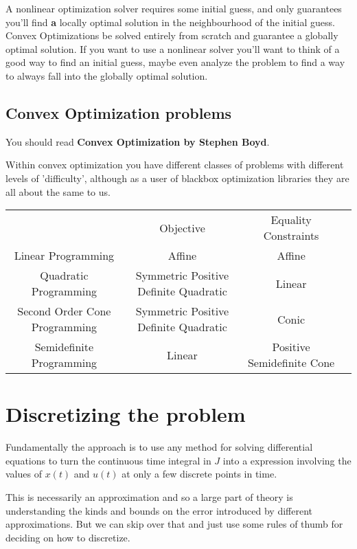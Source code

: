 \documentclass[a4paper, 10pt, twocolumn]{article}
\begin{document}
A nonlinear optimization solver requires some initial guess, and only guarantees you'll find \textbf{a} locally optimal solution in the neighbourhood of the initial guess. Convex Optimizations be solved entirely from scratch and guarantee a globally optimal solution. If you want to use a nonlinear solver you'll want to think of a good way to find an initial guess, maybe even analyze the problem to find a way to always fall into the globally optimal solution.

\subsection{Convex Optimization problems}

You should read \textbf{Convex Optimization by Stephen Boyd}.

Within convex optimization you have different classes of problems with different levels of 'difficulty', although as a user of blackbox optimization libraries they are all about the same to us.

\begin{tabular}[htb]{|c|c|c|c|}
                                  & Objective                             & Equality Constraints       \\

    Linear Programming            & Affine                                & Affine                     \\
    Quadratic Programming         & Symmetric Positive Definite Quadratic & Linear                     \\
    Second Order Cone Programming & Symmetric Positive Definite Quadratic & Conic                      \\
    Semidefinite Programming      & Linear                                & Positive Semidefinite Cone \\
\end{tabular}

\section{Discretizing the problem}

Fundamentally the approach is to use any method for solving differential equations to turn the continuous time integral in \(J\) into a expression involving the values of \(x(t)\) and \(u(t)\) at only a few discrete points in time.

This is necessarily an approximation and so a large part of theory is understanding the kinds and bounds on the error introduced by different approximations. But we can skip over that and just use some rules of thumb for deciding on how to discretize.
\end{document}
